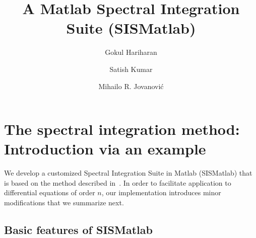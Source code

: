 \documentclass[%
secnumarabic,%
 amssymb, amsmath,%
 aps,prf,superscriptaddress,longbibliography
frontmatterverbose,
]{revtex4-2}
\begin{document}
\title{\bf \large A Matlab Spectral Integration Suite (SISMatlab)}


\author{Gokul Hariharan}
\author{Satish Kumar}
\author{Mihailo R. Jovanovi\'c}

\newcommand{\D}{\mathrm D}
\newcommand{\I}{\mathbf I}
\newcommand{\J}{\mathbf J}
\newcommand{\K}{\mathbf K}
\newcommand{\E}{\mathbf E}
\newcommand{\0}{\mathbf 0}
\newcommand{\T}{\mathbf T}
\newcommand{\R}{\mathbf R}
\newcommand{\DD}[2]{\frac{\partial^2 #1}{\partial #2^2}}
\newcommand{\BB}[1]{\boldsymbol #1}
\newcommand{\hh}[1]{\mathbf{\bar{\text{$#1$}}}}
\newcommand{\HH}[1]{\mathbf{#1}}
\newcommand{\MM}[1]{\mathcal{#1}}
\newcommand{\MMbf}[1]{\mathbfcal{#1}}
\pagebreak
\begin{abstract}

\end{abstract}
\maketitle
\section{The spectral integration method: Introduction via an example}
	\label{sec:intro}
	\vspace*{-2ex}
	
We develop a customized Spectral Integration Suite in Matlab (SISMatlab) that is based on the method described in~\cite{GreSIAM91,DuSIAM2016}. In order to facilitate application to differential equations of order $n$, our implementation introduces minor modifications that we summarize next. 

	\vspace*{-4ex}
	\subsection{Basic features of SISMatlab}
	
\end{document}
